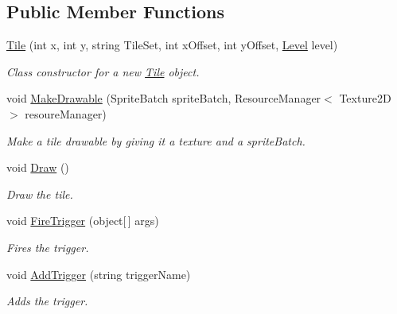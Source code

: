 \subsection*{Public Member Functions}
\begin{DoxyCompactItemize}
\item 
\hyperlink{class_athena_engine_1_1_framework_1_1_gameplay_1_1_tile_aa58d8156d0207a31a1f3ae9ed9f17451}{Tile} (int x, int y, string Tile\-Set, int x\-Offset, int y\-Offset, \hyperlink{class_athena_engine_1_1_framework_1_1_gameplay_1_1_level}{Level} level)
\begin{DoxyCompactList}\small\item\em Class constructor for a new \hyperlink{class_athena_engine_1_1_framework_1_1_gameplay_1_1_tile}{Tile} object. \end{DoxyCompactList}\item 
void \hyperlink{class_athena_engine_1_1_framework_1_1_gameplay_1_1_tile_abfd4056deadc2590bd1f07757873b364}{Make\-Drawable} (Sprite\-Batch sprite\-Batch, Resource\-Manager$<$ Texture2\-D $>$ resoure\-Manager)
\begin{DoxyCompactList}\small\item\em Make a tile drawable by giving it a texture and a sprite\-Batch. \end{DoxyCompactList}\item 
void \hyperlink{class_athena_engine_1_1_framework_1_1_gameplay_1_1_tile_aaf99c16084185fc023d5833c517be838}{Draw} ()
\begin{DoxyCompactList}\small\item\em Draw the tile. \end{DoxyCompactList}\item 
void \hyperlink{class_athena_engine_1_1_framework_1_1_gameplay_1_1_tile_a6277e841cb9acd8d50a2e1d208c6d478}{Fire\-Trigger} (object\mbox{[}$\,$\mbox{]} args)
\begin{DoxyCompactList}\small\item\em Fires the trigger. \end{DoxyCompactList}\item 
void \hyperlink{class_athena_engine_1_1_framework_1_1_gameplay_1_1_tile_a4fe5e325f339dc96f8bf040ca8d5dc1a}{Add\-Trigger} (string trigger\-Name)
\begin{DoxyCompactList}\small\item\em Adds the trigger. \end{DoxyCompactList}\end{DoxyCompactItemize}
